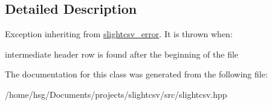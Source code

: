 \subsection{Detailed Description}
Exception inheriting from \hyperlink{classutils_1_1slightcsv__error}{slightcsv\+\_\+error}. It is thrown when\+:
\begin{DoxyItemize}
\item intermediate header row is found after the beginning of the file 
\end{DoxyItemize}

The documentation for this class was generated from the following file\+:\begin{DoxyCompactItemize}
\item 
/home/hsg/\+Documents/projects/slightcsv/src/slightcsv.\+hpp\end{DoxyCompactItemize}

